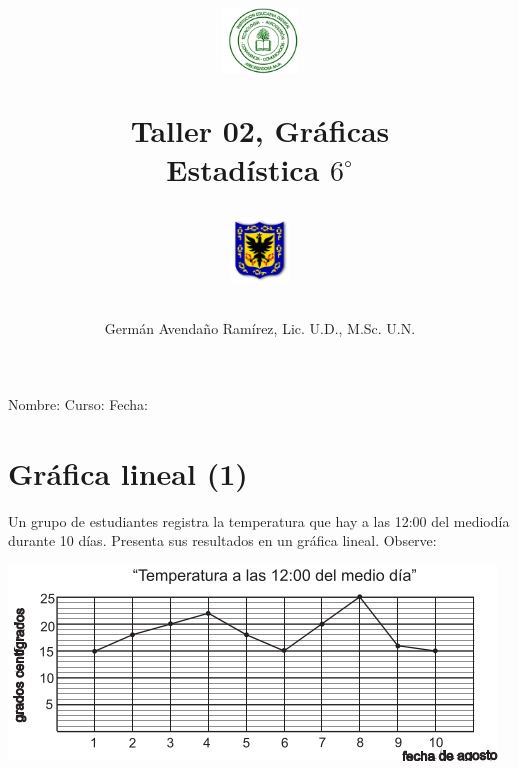 \documentclass[10pt,twoside]{article}
\author{Germ\'an Avenda\~no Ram\'irez, Lic. U.D., M.Sc. U.N.}
\title{\begin{minipage}{.2\textwidth}
\includegraphics[height=1.75cm]{Images/logo-colegio.png}\end{minipage}
\begin{minipage}{.55\textwidth}
\begin{center}
Taller 02, Gráficas  \\
Estadística $6^{\circ}$
\end{center}
\end{minipage}\hfill
\begin{minipage}{.2\textwidth}
\includegraphics[height=1.75cm]{Images/logo-sed.png} 
\end{minipage}}
\date{}
\begin{document}
\maketitle
Nombre: \hrulefill Curso: \underline{\hspace*{44pt}} Fecha: \underline{\hspace*{2.5cm}}
\section*{Gr\'afica lineal (1)}
Un grupo de estudiantes registra la temperatura que hay a las 12:00 del mediodía durante 10 días. Presenta sus resultados en un gráfica lineal. Observe:
\begin{center}
\includegraphics[scale=.75]{Images/grafica1.png} 
\end{center}
\end{document}
